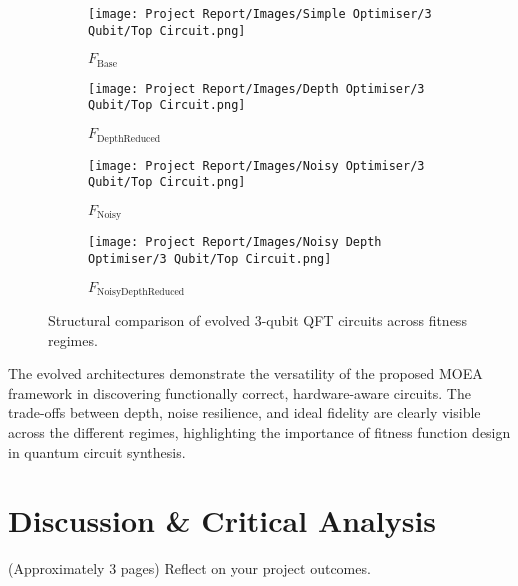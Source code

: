 \documentclass[11pt,a4paper]{article}
\begin{document}
\begin{figure}[H]
    \centering
    \begin{subfigure}[t]{0.49\textwidth}
        \centering
        \texttt{[image: Project Report/Images/Simple Optimiser/3 Qubit/Top Circuit.png]}
        \caption{$F_{\mathrm{Base}}$}
        \label{fig:struct_base}
    \end{subfigure}
    \hfill
    \begin{subfigure}[t]{0.49\textwidth}
        \centering
        \texttt{[image: Project Report/Images/Depth Optimiser/3 Qubit/Top Circuit.png]}
        \caption{$F_{\mathrm{DepthReduced}}$}
        \label{fig:struct_depth}
    \end{subfigure}

    \vspace{1em}

    \begin{subfigure}[t]{0.49\textwidth}
        \centering
        \texttt{[image: Project Report/Images/Noisy Optimiser/3 Qubit/Top Circuit.png]}
        \caption{$F_{\mathrm{Noisy}}$}
        \label{fig:struct_noisy}
    \end{subfigure}
    \hfill
    \begin{subfigure}[t]{0.49\textwidth}
        \centering
        \texttt{[image: Project Report/Images/Noisy Depth Optimiser/3 Qubit/Top Circuit.png]}
        \caption{$F_{\mathrm{NoisyDepthReduced}}$}
        \label{fig:struct_noisydepth}
    \end{subfigure}

    \caption{Structural comparison of evolved 3-qubit QFT circuits across fitness regimes.}
    \label{fig:structural_comparison_2q}
\end{figure}





The evolved architectures demonstrate the versatility of the proposed MOEA framework in discovering functionally correct, hardware-aware circuits. The trade-offs between depth, noise resilience, and ideal fidelity are clearly visible across the different regimes, highlighting the importance of fitness function design in quantum circuit synthesis.

%
%
\section{Discussion \& Critical Analysis}
(Approximately 3 pages) Reflect on your project outcomes.
\end{document}
